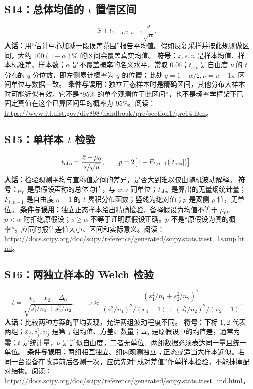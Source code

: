 \documentclass[UTF8,zihao=-4,openany,oneside,fontset=windows]{ctexbook}
\begin{document}
\subsection{S14：总体均值的 $t$ 置信区间}
\begin{equation}
 \bar{x}\pm t_{1-\alpha/2,\,n-1}\frac{s}{\sqrt n}.
\end{equation}
\textbf{人话：}用“估计中心加减一段误差范围”报告平均值。假如反复采样并按此规则做区间，大约 $100(1-\alpha)\%$ 的区间会覆盖真实均值。
\textbf{符号：}$\bar x,s,n$ 是样本均值、样本标准差、样本数；$\alpha$ 是不覆盖概率的名义水平，常取 $0.05$；$t_{q,\nu}$ 是自由度 $\nu$ 的 $t$ 分布的 $q$ 分位数，即左侧累计概率为 $q$ 的位置；此处 $q=1-\alpha/2,\nu=n-1$。区间单位与数据一致。
\textbf{条件与误用：}独立正态样本时是精确区间，其他分布大样本时可能近似有效。它不是“95\% 的单个观测位于此区间”，也不是频率学框架下已固定真值在这个已算区间里的概率为 95\%。阅读：\url{https://www.itl.nist.gov/div898/handbook/prc/section1/prc14.htm}。

\subsection{S15：单样本 $t$ 检验}
\begin{equation}
 t_{\rm obs}=\frac{\bar{x}-\mu_0}{s/\sqrt n},\qquad
 p=2\bigl[1-F_{t,n-1}(|t_{\rm obs}|)\bigr].
\end{equation}
\textbf{人话：}检验观测平均与宣称值之间的差异，是否大到难以仅由随机波动解释。
\textbf{符号：}$\mu_0$ 是原假设声称的总体均值，与 $\bar x,s$ 同单位；$t_{\rm obs}$ 是算出的无量纲统计量；$F_{t,n-1}$ 是自由度 $n-1$ 的 $t$ 累积分布函数；竖线为绝对值；$p$ 是双侧 $p$ 值，无单位。
\textbf{条件与误用：}独立正态样本给出精确检验，备择假设为均值不等于 $\mu_0$。$p<\alpha$ 时拒绝原假设；$p\ge\alpha$ 不等于证明原假设正确。$p$ 不是“原假设为真的概率”。应同时报告差值大小、区间和实际意义。阅读：\url{https://docs.scipy.org/doc/scipy/reference/generated/scipy.stats.ttest_1samp.html}。

\subsection{S16：两独立样本的 Welch 检验}
\begin{equation}
 t=\frac{\bar{x}_1-\bar{x}_2-\Delta_0}{\sqrt{s_1^2/n_1+s_2^2/n_2}},\qquad
 \nu\approx\frac{(s_1^2/n_1+s_2^2/n_2)^2}{(s_1^2/n_1)^2/(n_1-1)+(s_2^2/n_2)^2/(n_2-1)}.
\end{equation}
\textbf{人话：}比较两种方案的平均表现，允许两组波动程度不同。
\textbf{符号：}下标 $1,2$ 代表两组；$\bar{x}_j,s_j^2,n_j$ 是第 $j$ 组均值、方差、数量；$\Delta_0$ 是原假设中的均值差，通常为零；$t$ 是统计量，$\nu$ 是近似自由度，二者无单位。两组数据必须表达同一量且统一单位。
\textbf{条件与误用：}两组相互独立、组内观测独立；正态或适当大样本近似。若同一台设备在改造前后各测一次，应优先对“成对差值”作单样本检验，不能抹掉配对结构。阅读：\url{https://docs.scipy.org/doc/scipy/reference/generated/scipy.stats.ttest_ind.html}。
\end{document}
